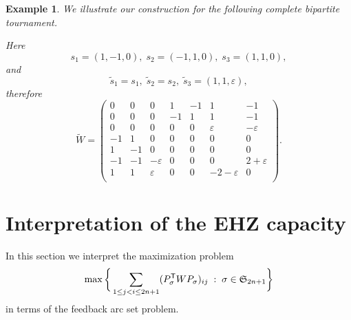 \documentclass{amsart}
\newtheorem{example}[defin]{Example}
\newcommand{\permS}{\mathfrak{S}}
\begin{document}
\begin{example}
  \label{ex:example}
  We illustrate our construction for the following complete bipartite
  tournament.
  \begin{center}
  \end{center}
  Here
  \[
    s_1 = (1,-1,0), \; s_2= (-1,1,0), \; s_3 = (1,1,0),
  \]
  and
  \[
    \tilde{s}_1 = s_1, \; \tilde{s}_2 = s_2, \; \tilde{s}_3 = (1,1,\varepsilon),
  \]
  therefore
  \[
    \tilde{W} = \left(
      \begin{array}{ccc|ccc|c}
      0 & 0& 0 & 1 & -1 & 1 & -1\\
      0 & 0 & 0 & -1 & 1 & 1 & -1\\
      0 & 0 & 0 & 0 & 0 & \varepsilon & -\varepsilon\\\hline
      -1 & 1 & 0 & 0 & 0 & 0 & 0\\
      1 & -1 & 0 & 0 & 0 & 0 & 0\\
        -1 & -1 & -\varepsilon & 0 & 0  & 0 & 2+\varepsilon \\ \hline
       1 & 1 & \varepsilon & 0 & 0 & -2-\varepsilon & 0\\
      \end{array}
      \right).
  \]
  \end{example}

% 
%
%

\section{Interpretation of the EHZ capacity}
\label{sec:interpretation}

In this section we interpret the maximization problem
\[
  \max\bigg\{\sum_{1 \leq j < i \leq 2n+1} (P_\sigma^{\sf T} W
  P_\sigma )_{ij} \; : \; \sigma \in \permS_{2n+1} \bigg\}
\]
in terms of the feedback arc set problem.
\end{document}
